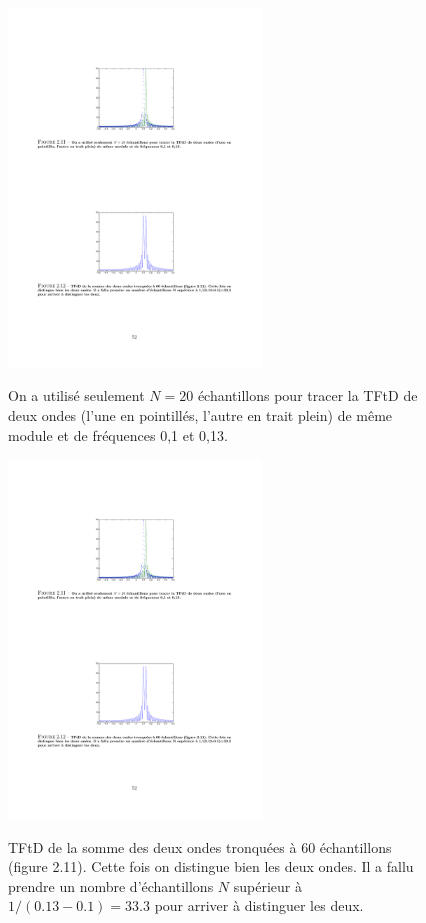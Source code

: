 \begin{figure}
  \centering
  \includegraphics[width=0.6\textwidth]{Figures/Figure2-11}\\
  \caption{On a utilis\'{e} seulement $N=20$ \'{e}chantillons pour tracer la TFtD de deux ondes (l'une en pointill\'{e}s, l'autre en trait plein) de m\^{e}me module et de fr\'{e}quences 0,1 et 0,13.}\label{fig:figure2-11}
\end{figure}


\begin{figure}
  \centering
  \includegraphics[width=0.6\textwidth]{Figures/Figure2-12}\\
  \caption{TFtD de la somme des deux ondes tronqu\'{e}es \`{a} 60 \'{e}chantillons (figure 2.11). Cette fois on distingue bien les deux ondes. Il a fallu prendre un nombre d'\'{e}chantillons $N$ sup\'{e}rieur \`{a} $1/(0.13-0.1)=33.3$ pour arriver \`{a} distinguer les deux.}\label{fig:figure2-12}
\end{figure}


